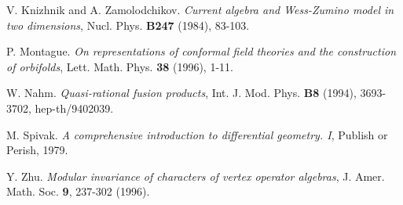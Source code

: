 \documentclass[a4paper,12pt]{article}
\providecommand{\ti}[1]{\textit{#1}}
\begin{document}
\begin{thebibliography}{99}
 V. Knizhnik and A. Zamolodchikov.  \ti{Current algebra and Wess-Zumino model in two dimensions}, Nucl. Phys. \textbf{B247} (1984), 83-103.

 P. Montague.  \ti{On representations of conformal field theories and the construction of orbifolds}, Lett. Math. Phys. \textbf{38} (1996), 1-11.

 W. Nahm.  \ti{Quasi-rational fusion products}, Int. J. Mod. Phys. \textbf{B8} (1994), 3693-3702, hep-th/9402039.

 M. Spivak.  \ti{A comprehensive introduction to differential geometry. I}, Publish or Perish, 1979. 

 Y. Zhu.  \ti{Modular invariance of characters of vertex operator algebras}, J. Amer. Math. Soc. \textbf{9}, 237-302 (1996).

\end{thebibliography}
\end{document}
